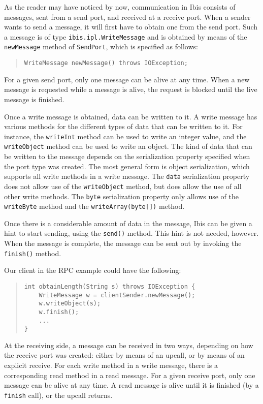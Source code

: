 \documentclass[10pt]{article}
\begin{document}
As the reader may have noticed by now, communication in Ibis
consists of messages, sent from a send port, and received at a
receive port. When a sender wants to send a message, it will first
have to obtain one from the send port. Such a message is of
type \verb+ibis.ipl.WriteMessage+ and is obtained by means of
the \verb+newMessage+ method of \verb+SendPort+, which is specified
as follows:

\begin{quote}
\begin{verbatim}
WriteMessage newMessage() throws IOException;
\end{verbatim}
\end{quote}

For a given send port, only one message can be alive at any time.
When a new message is requested while a message is alive, the request
is blocked until the live message is finished.

Once a write message is obtained, data can be written to it.
A write message has various methods for the different types of
data that can be written to it. For instance, the
\verb+writeInt+ method can be used to write an integer value,
and the \verb+writeObject+ method can be used to write an object.
The kind of data that can be written to the message depends on the
serialization property specified when the port type was created.
The most general form is object serialization, which supports 
all write methods in a write message.
The \verb+data+ serialization property does not allow use of the
\verb+writeObject+ method, but does allow the use of all other write
methods. The \verb+byte+ serialization property only allows use
of the \verb+writeByte+ method and the \verb+writeArray(byte[])+
method.

Once there is a considerable amount of data in the message, Ibis
can be given a hint to start sending, using the \verb+send()+
method. This hint is not needed, however. When the message is
complete, the message can be sent out by invoking the
\verb+finish()+ method.

Our client in the RPC example could have the following:
\begin{quote}
\begin{verbatim}
int obtainLength(String s) throws IOException {
    WriteMessage w = clientSender.newMessage();
    w.writeObject(s);
    w.finish();
    ...
}
\end{verbatim}
\end{quote}

At the receiving side, a message can be received in two ways,
depending on how the receive port was created: either by means of an
upcall, or by means of an explicit receive. For each write method
in a write message, there is a corresponding read method in
a read message. For a given receive port, only one message can
be alive at any time. A read message is alive until it is
finished (by a \verb+finish+ call), or the upcall returns.
\end{document}
